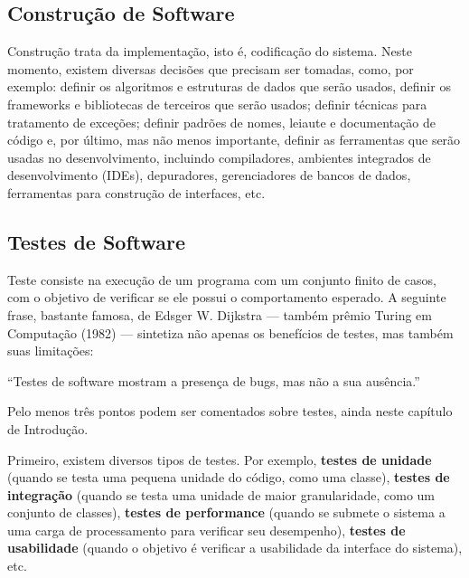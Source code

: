 \documentclass[
  11pt,
  twoside]{book}
\renewenvironment{quote}{\centering \vspace{1.5ex} \begin{tcolorbox}[colback=backcolor, width=4.9in]}{\end{tcolorbox}}
\begin{document}
\hypertarget{construuxe7uxe3o-de-software}{%
\subsection{Construção de Software}\label{construuxe7uxe3o-de-software}}

 Construção trata da implementação, isto
é, codificação do sistema. Neste momento, existem diversas decisões que
precisam ser tomadas, como, por exemplo: definir os algoritmos e
estruturas de dados que serão usados, definir os frameworks e
bibliotecas de terceiros que serão usados; definir técnicas para
tratamento de exceções; definir padrões de nomes, leiaute e documentação
de código e, por último, mas não menos importante, definir as
ferramentas que serão usadas no desenvolvimento, incluindo compiladores,
ambientes integrados de desenvolvimento (IDEs), depuradores,
gerenciadores de bancos de dados, ferramentas para construção de
interfaces, etc.

\hypertarget{testes-de-software}{%
\subsection{Testes de Software}\label{testes-de-software}}

  Teste consiste na
execução de um programa com um conjunto finito de casos, com o objetivo
de verificar se ele possui o comportamento esperado. A seguinte frase,
bastante famosa, de Edsger W. Dijkstra --- também prêmio Turing em
Computação (1982) --- sintetiza não apenas os benefícios de testes, mas
também suas limitações:

\begin{quote}
``Testes de software mostram a presença de bugs, mas não a sua
ausência.''
\end{quote}

Pelo menos três pontos podem ser comentados sobre testes, ainda neste
capítulo de Introdução.

Primeiro, existem diversos tipos de testes. Por exemplo, \textbf{testes
de unidade} (quando se testa uma pequena unidade do código, como uma
classe), \textbf{testes de integração} (quando se testa uma unidade de
maior granularidade, como um conjunto de classes), \textbf{testes de
performance} (quando se submete o sistema a uma carga de processamento
para verificar seu desempenho), \textbf{testes de usabilidade} (quando o
objetivo é verificar a usabilidade da interface do sistema), etc.
\end{document}
